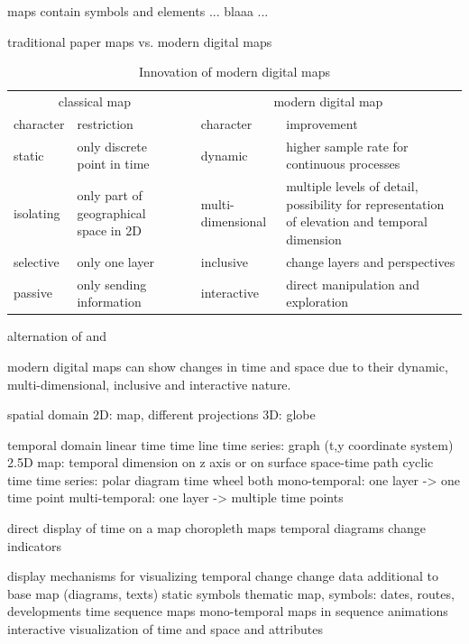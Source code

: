maps contain symbols and elements
  ... blaaa ...

traditional paper maps vs. modern digital maps
\begin{table}[ht]
\centering
\begin{tabular}{llp{1em}ll}
    \toprule
    \multicolumn{2}{c}{classical map} & & \multicolumn{2}{c}{modern digital map} \\
    character & restriction & & character & improvement \\
    \midrule
    static & only discrete point in time & & dynamic & higher sample rate for continuous processes \\
    isolating & only part of geographical space in 2D & & multi-dimensional & multiple levels of detail, possibility for representation of elevation and temporal dimension \\
    selective & only one layer & & inclusive & change layers and perspectives \\
    passive & only sending information & & interactive & direct manipulation and exploration \\
    \bottomrule
\end{tabular}
\caption{Innovation of modern digital maps}
\small{alternation of \cite{karcher} and \cite[p. 145]{ott2001time}}
\label{tab:maps_restrictions}
\end{table}

modern digital maps can show changes in time and space due to their dynamic, multi-dimensional, inclusive and interactive nature.

spatial domain
  2D: map, different projections
  3D: globe

temporal domain
  linear time
    time line
    time series: graph (t,y coordinate system)
    2.5D map: temporal dimension on z axis or on surface
    space-time path
  cyclic time
    time series: polar diagram
    time wheel
  both
    mono-temporal: one layer -> one time point
    multi-temporal: one layer -> multiple time points
\cite[p. 144]{ott2001time}

direct display of time on a map
  choropleth maps
  temporal diagrams
  change indicators

display mechanisms for visualizing temporal change
  change data         additional to base map (diagrams, texts)
  static symbols      thematic map, symbols: dates, routes, developments
  time sequence maps  mono-temporal maps in sequence
  animations          interactive visualization of time and space and attributes
\cite[p. 146-147]{ott2001time}



